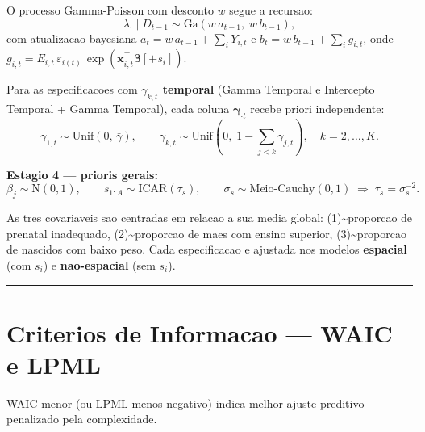 \documentclass[
]{article}
\begin{document}
O processo Gamma-Poisson com desconto \(w\) segue a recursao: \[
\lambda_{\cdot} \mid D_{t-1} \sim \mathrm{Ga}(w\,a_{t-1},\; w\,b_{t-1}),
\] com atualizacao bayesiana \(a_t = w\,a_{t-1} + \sum_i Y_{i,t}\) e
\(b_t = w\,b_{t-1} + \sum_i g_{i,t}\), onde
\(g_{i,t} = E_{i,t}\,\varepsilon_{i(t)}\,\exp(\mathbf{x}_{i,t}^\top\boldsymbol{\beta}[+s_i])\).

Para as especificacoes com \textbf{\(\gamma_{k,t}\) temporal} (Gamma
Temporal e Intercepto Temporal + Gamma Temporal), cada coluna
\(\boldsymbol{\gamma}_{\cdot t}\) recebe priori independente: \[
\gamma_{1,t} \sim \mathrm{Unif}(0,\,\bar{\gamma}), \qquad
\gamma_{k,t} \sim \mathrm{Unif}\!\left(0,\;1-\textstyle\sum_{j<k}\gamma_{j,t}\right),
\quad k = 2,\ldots,K.
\]

\textbf{Estagio 4 --- prioris gerais:} \[
\beta_j \sim \mathrm{N}(0,1), \qquad
s_{1:A} \sim \mathrm{ICAR}(\tau_s), \qquad
\sigma_s \sim \mathrm{Meio\text{-}Cauchy}(0,1) \;\Rightarrow\; \tau_s = \sigma_s^{-2}.
\]

As tres covariaveis sao centradas em relacao a sua media global:
(1)\textasciitilde proporcao de prenatal inadequado,
(2)\textasciitilde proporcao de maes com ensino superior,
(3)\textasciitilde proporcao de nascidos com baixo peso. Cada
especificacao e ajustada nos modelos \textbf{espacial} (com \(s_i\)) e
\textbf{nao-espacial} (sem \(s_i\)).

\begin{center}\rule{0.5\linewidth}{0.5pt}\end{center}

\section{Criterios de Informacao --- WAIC e
LPML}\label{criterios-de-informacao-waic-e-lpml}

WAIC menor (ou LPML menos negativo) indica melhor ajuste preditivo
penalizado pela complexidade.

\begingroup\fontsize{9}{11}\selectfont
\end{document}
